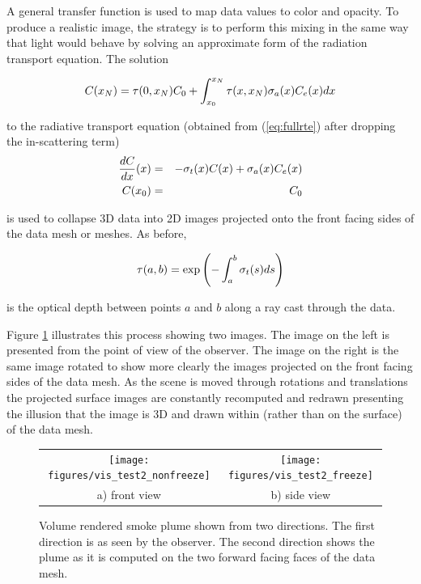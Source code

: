 A general transfer function is used to map data values to color and opacity. To produce a realistic image, the strategy is to perform this mixing in the same way that light would behave by solving an approximate form of the radiation transport equation.  The solution

\begin{equation}
\label{eq:rtesoln}
 C(x_N)=\tau(0,x_N)C_0 + \int_{x_0}^{x_N}\tau(x,{x_N})\sigma_a(x)C_e(x) dx
\end{equation}

to the radiative transport equation (obtained from (\ref{eq:fullrte}) after dropping the in-scattering term)
\begin{eqnarray*}
\frac{dC}{dx}(x)&=&-\sigma_t(x) C(x) + \sigma_a(x) C_e(x)\\
 C(x_0)&=&C_0\nonumber
\end{eqnarray*}

is used to collapse 3D data into 2D images projected onto the front facing sides of the data mesh or meshes. As before,

\begin{equation}
\label{eq:optdepth}
\tau(a,b)=\exp\left({-\int_{a}^{b} \sigma_t(s) ds}\right)
\end{equation}

is the optical depth between points $a$ and $b$ along a ray cast through the data.  

Figure \ref{fig:volplume_example} illustrates this process showing two images.  The image on the left is presented from the point of view of the observer.  The image on the right is the same image rotated to show more clearly the images projected on the front facing sides of the data mesh.  As the scene is moved through rotations and translations the projected surface images are constantly recomputed and redrawn presenting the illusion that the image is 3D and drawn within (rather than on the surface) of the data mesh.

\begin{figure}[\figoptions]
\begin{center}
\begin{tabular}{cc}
\texttt{[image: figures/vis\_test2\_nonfreeze]}&
\texttt{[image: figures/vis\_test2\_freeze]}\\
a) front view&b) side view\\
\end{tabular}
\end{center}
\caption[Volume rendered smoke plume shown from two directions.]{Volume rendered smoke plume shown from two directions.
The first direction is as seen by the observer.  The second direction shows the plume as it is computed on the two forward facing faces of the data mesh.
}
\label{fig:volplume_example}
\end{figure}

